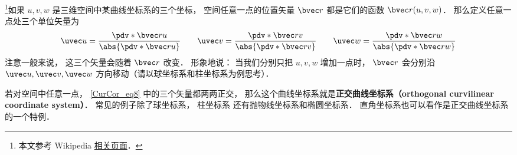 
\begin{issues}
\issueTODO
\end{issues}


\footnote{本文参考 Wikipedia \href{https://en.wikipedia.org/wiki/Curvilinear_coordinates}{相关页面}．}如果 $u, v, w$ 是三维空间中某曲线坐标系的三个坐标， 空间任意一点的位置矢量 $\bvec r$ 都是它们的函数 $\bvec r(u, v, w)$． 那么定义任意一点处三个单位矢量为
\begin{equation}\label{CurCor_eq8}
\uvec u = \frac{\pdv*{\bvec r}{u}}{\abs{\pdv*{\bvec r}{u}}}\qquad
\uvec v = \frac{\pdv*{\bvec r}{v}}{\abs{\pdv*{\bvec r}{v}}}\qquad
\uvec w = \frac{\pdv*{\bvec r}{w}}{\abs{\pdv*{\bvec r}{w}}}
\end{equation}
注意一般来说， 这三个矢量会随着 $\bvec r$ 改变． 形象地说： 当我们分别只把 $u, v, w$ 增加一点时， $\bvec r$ 会分别沿 $\uvec u, \uvec v, \uvec w$ 方向移动（请以球坐标系和柱坐标系为例思考）．

若对空间中任意一点， \autoref{CurCor_eq8} 中的三个矢量都两两正交， 那么这个曲线坐标系就是\textbf{正交曲线坐标系（orthogonal curvilinear coordinate system）}． 常见的例子除了球坐标系， 柱坐标系 还有抛物线坐标系和椭圆坐标系． 直角坐标系也可以看作是正交曲线坐标系的一个特例．

